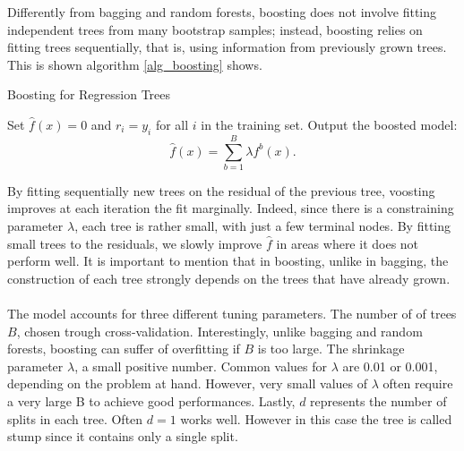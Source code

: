 \documentclass[a4paper,11pt]{article}
\begin{document}
Differently from bagging and random forests, boosting does not involve fitting independent trees from many bootstrap samples; instead, boosting relies on fitting trees sequentially, that is, using information from previously grown trees. 
This is shown algorithm \ref{alg_boosting} shows. 
\begin{algorithm} [h]
  \caption{Boosting for Regression Trees}
  \label{alg_boosting}
  \SetAlgoLined
  \DontPrintSemicolon
  
  Set $\hat{f}(x) = 0$ and $r_i = y_i$ for all $i$ in the training set.\;
  Output the boosted model:
  \begin{equation}
  \hat{f}(x) = \sum_{b=1}^B \lambda f^b(x).
  \end{equation}\;
  
\end{algorithm}

By fitting sequentially new trees on the residual of the previous tree, voosting improves at each iteration the fit marginally. Indeed, since there is a constraining parameter $\lambda$, each tree is rather small, with just a few terminal nodes. By 
fitting small trees to the residuals, we slowly improve $\hat{f}$ in areas where it
does not perform well. It is important to mention that in boosting, unlike in bagging, the construction of each tree strongly depends on the trees that have already grown.
\\\\The model accounts for three different tuning parameters. The number of of trees $B$, chosen trough cross-validation.  Interestingly, unlike bagging and random forests, boosting can suffer of overfitting if $B$ is too large.
The shrinkage parameter $\lambda$, a small positive number. Common values for $\lambda$ are 0.01 or 0.001, depending on the problem at hand. However, very small values of $\lambda$ often require a very large B to achieve good performances. Lastly, $d$ represents the number of splits in each tree. Often $d=1$ works well. However in this case the tree is called stump since it contains only a single split.
\end{document}
